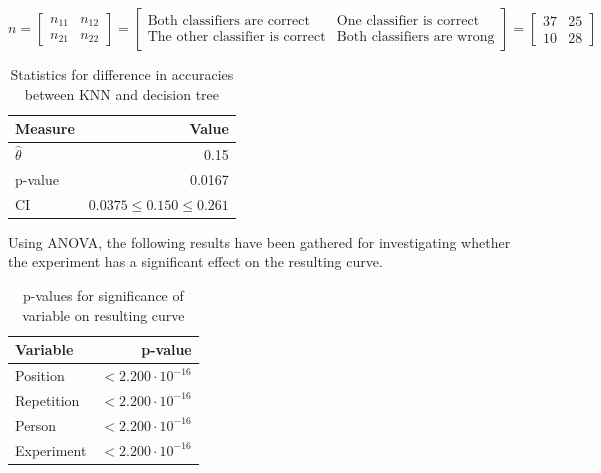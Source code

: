 \documentclass[11pt, fleqn, titlepage]{article}
\begin{document}
\[n = \begin{bmatrix} n_{11} & n_{12} \\ n_{21} & n_{22} \end{bmatrix} = \begin{bmatrix} \text{Both classifiers are correct} & \text{One classifier is correct} \\ \text{The other classifier is correct} & \text{Both classifiers are wrong} \end{bmatrix} = \begin{bmatrix} 37 & 25 \\ 10 & 28 \end{bmatrix}\] 

\begin{table}[H]
	\centering
	\begin{tabular}{l r}
		\toprule
		Measure        & Value                          \\ \midrule
		$\hat{\theta}$ & 0.15                           \\ 
		p-value        & 0.0167                         \\ 
		CI             & $0.0375 \leq 0.150 \leq 0.261$ \\ \bottomrule
	\end{tabular}
\caption{Statistics for difference in accuracies between KNN and decision tree}
\label{measuresKNNDT}
\end{table}

\noindent Using ANOVA, the following results have been gathered for investigating whether the experiment has a significant effect on the resulting curve.

\begin{table}[H]
	\centering
	\begin{tabular}{l r}
		\toprule
		Variable       & p-value                         \\ \midrule
		Position       & $<2.200 \cdot 10^{-16}$         \\ 
		Repetition     & $<2.200 \cdot 10^{-16}$         \\ 
		Person         & $<2.200 \cdot 10^{-16}$         \\ 
		Experiment     & $<2.200 \cdot 10^{-16}$         \\ \bottomrule
	\end{tabular}
\caption{p-values for significance of variable on resulting curve}
\label{p-values}
\end{table}



\end{document}
